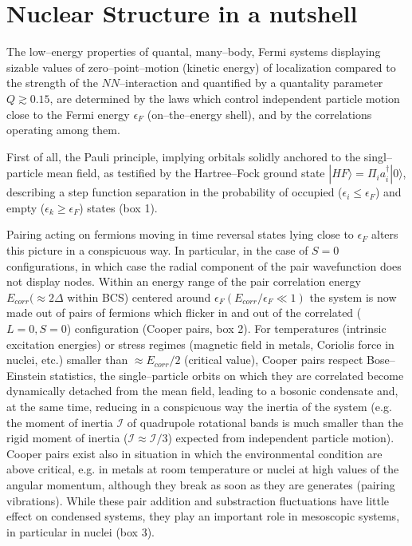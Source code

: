 \documentclass[a4paper,11pt]{book}
\numberwithin{equation}{section}
\numberwithin{figure}{section}
\numberwithin{table}{section}
\begin{document}
\section{Nuclear Structure in a nutshell}
The low--energy properties of quantal, many--body, Fermi systems displaying sizable values of zero--point--motion (kinetic energy) of localization compared to the strength of the $NN$--interaction and quantified by a quantality parameter $Q\gtrsim 0.15$, are determined by the laws which control independent particle motion close to the Fermi energy $\epsilon_F$ (on--the--energy shell), and by the correlations operating among them.


First of all, the Pauli principle, implying orbitals solidly anchored to the singl--particle mean field, as testified by the Hartree--Fock ground state $|HF\rangle=\Pi_i a^\dagger_i|0\rangle$, describing a step function separation in the probability of occupied ($\epsilon_i \leq \epsilon_F$) and empty ($\epsilon_k \geq \epsilon_F$) states (box 1).


Pairing acting on fermions moving in time reversal states lying close to $\epsilon_F$ alters this picture in a conspicuous way. In particular, in the case of $S=0$ configurations, in which case the radial component of the pair wavefunction does not display nodes. Within an energy range of the pair correlation energy $E_{corr} (\approx 2\Delta$ within BCS) centered around $\epsilon_F (E_{corr}/\epsilon_F\ll 1)$ the system is now made out of pairs of fermions which flicker in and out of the correlated ($L=0,S=0$) configuration (Cooper pairs, box 2). For temperatures (intrinsic excitation energies) or stress regimes (magnetic field in metals, Coriolis force in nuclei, etc.) smaller than $\approx E_{corr}/2$ (critical value), Cooper pairs respect Bose--Einstein statistics, the single--particle orbits on which they are correlated become dynamically detached from the mean field, leading to a bosonic condensate and, at the same time, reducing in a conspicuous way the inertia of the system (e.g. the moment of inertia $\mathcal{I}$ of quadrupole rotational bands is much smaller than the rigid moment of inertia ($\mathcal{I}\approx \mathcal{I}/3$) expected from independent particle motion). Cooper pairs exist also in situation in which the environmental condition are above critical, e.g. in metals at room temperature or nuclei at high values of the angular momentum, although they break as soon as they are generates (pairing vibrations). While these pair addition and substraction fluctuations have little effect on condensed systems, they play an important role in mesoscopic systems, in particular in nuclei (box 3).
\end{document}
